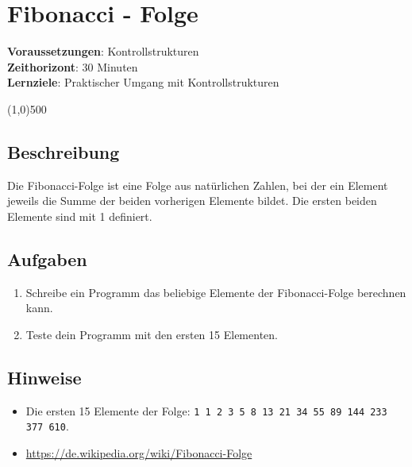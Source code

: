 

\chapter*{Fibonacci - Folge}

\headingfont
\parbox {\textwidth}{
    \textbf{Voraussetzungen}: Kontrollstrukturen \\
    \textbf{Zeithorizont}: 30 Minuten \\
    \textbf{Lernziele}: Praktischer Umgang mit Kontrollstrukturen
}

\normalfont
\begin{center}
\line(1,0){500}
\end{center}
\vspace{1cm}

\section*{Beschreibung}
Die Fibonacci-Folge ist eine Folge aus natürlichen Zahlen, bei der ein Element jeweils die Summe der beiden vorherigen Elemente bildet. Die ersten beiden Elemente sind mit 1 definiert.

\section*{Aufgaben}
\begin{enumerate}
     \item Schreibe ein Programm das beliebige Elemente der Fibonacci-Folge berechnen kann.
     \item Teste dein Programm mit den ersten 15 Elementen.
\end{enumerate}

\section*{Hinweise}
\begin{itemize}
    \item Die ersten 15 Elemente der Folge: \texttt{1 1 2 3 5 8 13 21 34 55 89 144 233 377 610}.
    \item \url{https://de.wikipedia.org/wiki/Fibonacci-Folge}
\end{itemize}


